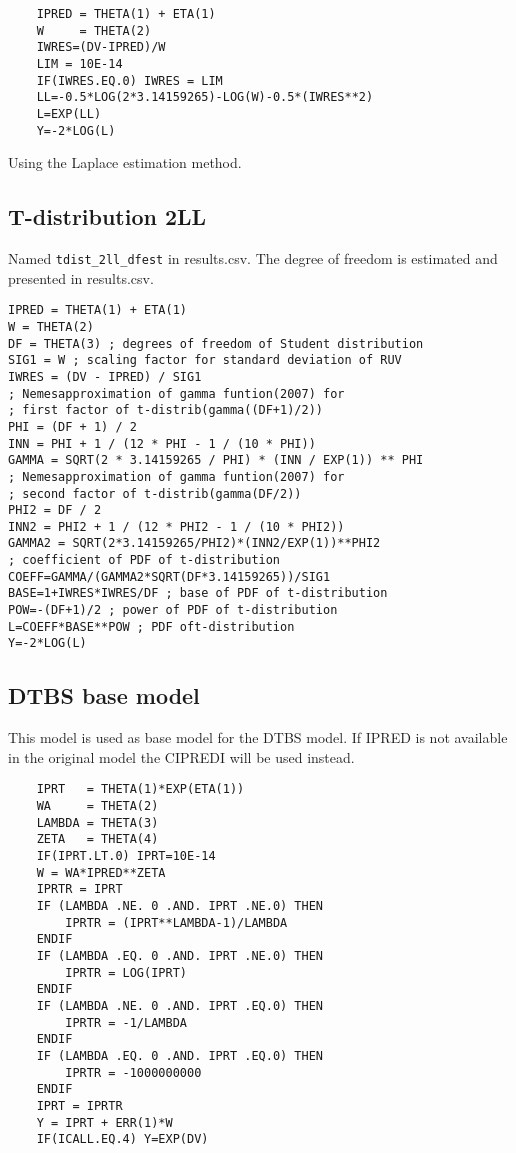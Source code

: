 \begin{verbatim}
    IPRED = THETA(1) + ETA(1)
	W     = THETA(2)
	IWRES=(DV-IPRED)/W
	LIM = 10E-14
	IF(IWRES.EQ.0) IWRES = LIM
	LL=-0.5*LOG(2*3.14159265)-LOG(W)-0.5*(IWRES**2)
	L=EXP(LL)
	Y=-2*LOG(L)
\end{verbatim}

Using the Laplace estimation method.

\subsection{T-distribution 2LL}
Named \verb|tdist_2ll_dfest| in results.csv. The degree of freedom is estimated and presented in results.csv.

\begin{verbatim}
IPRED = THETA(1) + ETA(1)
W = THETA(2)
DF = THETA(3) ; degrees of freedom of Student distribution
SIG1 = W ; scaling factor for standard deviation of RUV
IWRES = (DV - IPRED) / SIG1
; Nemesapproximation of gamma funtion(2007) for
; first factor of t-distrib(gamma((DF+1)/2))
PHI = (DF + 1) / 2
INN = PHI + 1 / (12 * PHI - 1 / (10 * PHI))
GAMMA = SQRT(2 * 3.14159265 / PHI) * (INN / EXP(1)) ** PHI
; Nemesapproximation of gamma funtion(2007) for
; second factor of t-distrib(gamma(DF/2))
PHI2 = DF / 2
INN2 = PHI2 + 1 / (12 * PHI2 - 1 / (10 * PHI2))
GAMMA2 = SQRT(2*3.14159265/PHI2)*(INN2/EXP(1))**PHI2
; coefficient of PDF of t-distribution
COEFF=GAMMA/(GAMMA2*SQRT(DF*3.14159265))/SIG1
BASE=1+IWRES*IWRES/DF ; base of PDF of t-distribution
POW=-(DF+1)/2 ; power of PDF of t-distribution
L=COEFF*BASE**POW ; PDF oft-distribution
Y=-2*LOG(L)
\end{verbatim}

\subsection{DTBS base model}
This model is used as base model for the DTBS model. If IPRED is not available in the original model the CIPREDI will be used instead.
\begin{verbatim}
    IPRT   = THETA(1)*EXP(ETA(1))
	WA     = THETA(2)
	LAMBDA = THETA(3)
	ZETA   = THETA(4)
	IF(IPRT.LT.0) IPRT=10E-14
	W = WA*IPRED**ZETA
	IPRTR = IPRT
	IF (LAMBDA .NE. 0 .AND. IPRT .NE.0) THEN
		IPRTR = (IPRT**LAMBDA-1)/LAMBDA
	ENDIF
	IF (LAMBDA .EQ. 0 .AND. IPRT .NE.0) THEN
		IPRTR = LOG(IPRT)
	ENDIF
	IF (LAMBDA .NE. 0 .AND. IPRT .EQ.0) THEN
		IPRTR = -1/LAMBDA
	ENDIF
	IF (LAMBDA .EQ. 0 .AND. IPRT .EQ.0) THEN
		IPRTR = -1000000000
	ENDIF
	IPRT = IPRTR
	Y = IPRT + ERR(1)*W
	IF(ICALL.EQ.4) Y=EXP(DV)
\end{verbatim}

